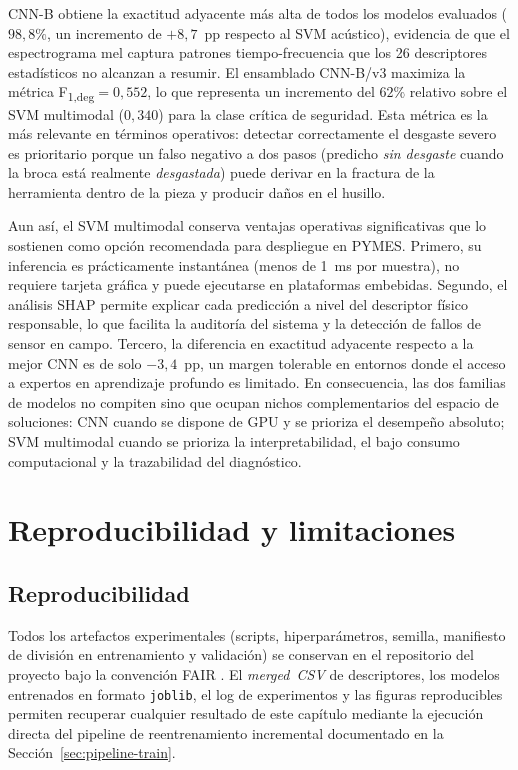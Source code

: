 \documentclass[12pt, letterpaper]{report}
\begin{document}
CNN-B obtiene la exactitud adyacente más alta de todos los modelos
evaluados ($98{,}8\%$, un incremento de $+8{,}7$~pp respecto al SVM
acústico), evidencia de que el espectrograma mel captura patrones
tiempo-frecuencia que los 26 descriptores estadísticos no alcanzan a
resumir. El ensamblado CNN-B/v3 maximiza la métrica
F\textsubscript{1,deg}$=0{,}552$, lo que representa un incremento del
$62\%$ relativo sobre el SVM multimodal ($0{,}340$) para la clase
crítica de seguridad. Esta métrica es la más relevante en términos
operativos: detectar correctamente el desgaste severo es prioritario
porque un falso negativo a dos pasos (predicho \emph{sin desgaste}
cuando la broca está realmente \emph{desgastada}) puede derivar en la
fractura de la herramienta dentro de la pieza y producir daños en el
husillo.

Aun así, el SVM multimodal conserva ventajas operativas significativas
que lo sostienen como opción recomendada para despliegue en PYMES.
Primero, su inferencia es prácticamente instantánea (menos de 1~ms por
muestra), no requiere tarjeta gráfica y puede ejecutarse en
plataformas embebidas. Segundo, el análisis SHAP permite explicar cada
predicción a nivel del descriptor físico responsable, lo que facilita
la auditoría del sistema y la detección de fallos de sensor en campo.
Tercero, la diferencia en exactitud adyacente respecto a la mejor CNN
es de solo $-3{,}4$~pp, un margen tolerable en entornos donde el
acceso a expertos en aprendizaje profundo es limitado. En
consecuencia, las dos familias de modelos no compiten sino que ocupan
nichos complementarios del espacio de soluciones: CNN cuando se
dispone de GPU y se prioriza el desempeño absoluto; SVM multimodal
cuando se prioriza la interpretabilidad, el bajo consumo computacional
y la trazabilidad del diagnóstico.

\section{Reproducibilidad y limitaciones}
\label{sec:limitaciones}

\subsection{Reproducibilidad}
Todos los artefactos experimentales (scripts, hiperparámetros, semilla,
manifiesto de división en entrenamiento y validación) se conservan en
el repositorio del proyecto bajo la convención FAIR
\cite{wilkinson2016}. El \emph{merged~CSV} de descriptores, los
modelos entrenados en formato \texttt{joblib}, el log de experimentos y
las figuras reproducibles permiten recuperar cualquier resultado de este
capítulo mediante la ejecución directa del pipeline de reentrenamiento
incremental documentado en la Sección~\ref{sec:pipeline-train}.
\end{document}
